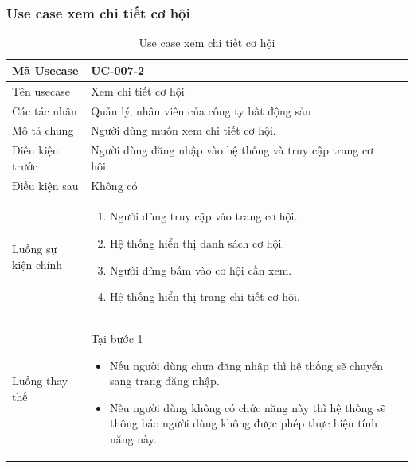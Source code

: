 \documentclass[12pt,a4paper]{article}
\begin{document}
    \subsubsection*{Use case xem chi tiết cơ hội}
    \begin{table}[H]
        \centering
        \begin{tabular}{|p{3.5cm}|p{11.5cm}|c|}
            \hline
            Mã Usecase      & UC-007-2                                                    \\
            \hline
            Tên usecase     & Xem chi tiết cơ hội                                         \\
            \hline
            Các tác nhân    & Quản lý, nhân viên của công ty bất động sản                 \\
            \hline
            Mô tả chung     & Người dùng muốn xem chi tiết cơ hội.                        \\
            \hline

            Điều kiện trước & Người dùng đăng nhập vào hệ thống và truy cập trang cơ hội. \\
            \hline

            Điều kiện sau   & Không có                                                    \\
            \hline

            Luồng sự kiện chính & \vspace{-.8cm}\begin{enumerate}
                                                    \item Người dùng truy cập vào trang cơ hội.
                                                    \item Hệ thống hiển thị danh sách cơ hội.
                                                    \item Người dùng bấm vào cơ hội cần xem.
                                                    \item Hệ thống hiển thị trang chi tiết cơ hội.
            \end{enumerate}
            \\
            \hline
            Luồng thay thế & Tại bước 1\newline
            \vspace{-.8cm}\begin{itemize}
                              \item Nếu người dùng chưa đăng nhập thì hệ thống sẽ chuyển sang trang đăng nhập.
                              \item  Nếu người dùng không có chức năng này thì hệ thống sẽ thông báo người dùng không được phép thực hiện tính năng này.
            \end{itemize}

            \\    \hline
        \end{tabular}
        \caption{Use case xem chi tiết cơ hội}
    \end{table}
\end{document}
